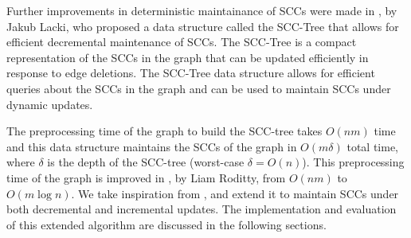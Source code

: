 Further improvements in deterministic maintainance of SCCs were made in \cite[2013]{scc_tree_reference}, by Jakub Lacki, who proposed a data structure called the SCC-Tree that allows for efficient decremental maintenance of SCCs. The SCC-Tree is a compact representation of the SCCs in the graph that can be updated efficiently in response to edge deletions. The SCC-Tree data structure allows for efficient queries about the SCCs in the graph and can be used to maintain SCCs under dynamic updates.

The preprocessing time of the graph to build the SCC-tree takes $O(nm)$ time and this data structure maintains the SCCs of the graph in $O(m\delta)$ total time, where $\delta$ is the depth of the SCC-tree (worst-case $\delta = O(n)$).
This preprocessing time of the graph is improved in \cite[2013]{article2013}, by Liam Roditty, from $O(nm)$ to $O(m\log n)$.
We take inspiration from \cite{scc_tree_reference}, and extend it to maintain SCCs under both decremental and incremental updates.
The implementation and evaluation of this extended algorithm are discussed in the following sections.